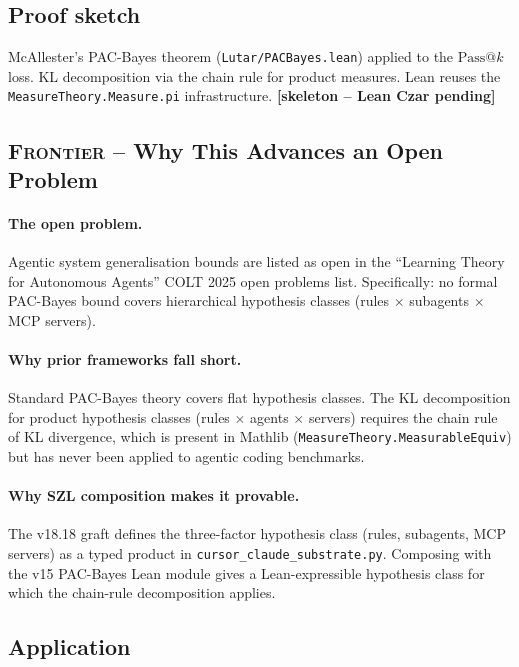 \subsection*{Proof sketch}

McAllester's PAC-Bayes theorem (\texttt{Lutar/PACBayes.lean})
applied to the $\mathrm{Pass}@k$ loss.  KL decomposition via the
chain rule for product measures.  Lean reuses the
\texttt{MeasureTheory.Measure.pi} infrastructure.
\hfill \textbf{[skeleton -- Lean Czar pending]}

\subsection*{\textsc{Frontier} -- Why This Advances an Open Problem}

\paragraph{The open problem.}
Agentic system generalisation bounds are listed as open in the
``Learning Theory for Autonomous Agents'' COLT 2025 open problems
list.  Specifically: no formal PAC-Bayes bound covers hierarchical
hypothesis classes (rules $\times$ subagents $\times$ MCP servers).

\paragraph{Why prior frameworks fall short.}
Standard PAC-Bayes theory covers flat hypothesis classes.  The
KL decomposition for product hypothesis classes (rules $\times$
agents $\times$ servers) requires the chain rule of KL divergence,
which is present in Mathlib (\texttt{MeasureTheory.MeasurableEquiv})
but has never been applied to agentic coding benchmarks.

\paragraph{Why SZL composition makes it provable.}
The v18.18 graft defines the three-factor hypothesis class
(rules, subagents, MCP servers) as a typed product in
\texttt{cursor\_claude\_substrate.py}.  Composing with the v15
PAC-Bayes Lean module gives a Lean-expressible hypothesis class
for which the chain-rule decomposition applies.

\subsection*{Application}

